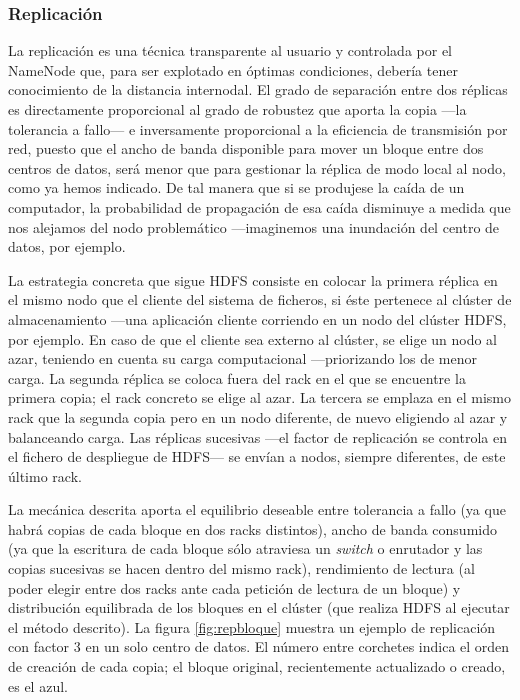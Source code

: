 \subsubsection{Replicaci\'on}\label{subsubsec:replicacionbloques}
\noindent La replicaci\'on es una t\'ecnica transparente al usuario y controlada por el NameNode que, para ser explotado en \'optimas condiciones, deber\'ia tener conocimiento de la distancia internodal. El grado de separaci\'on entre dos r\'eplicas es directamente proporcional al grado de robustez que aporta la copia ---la tolerancia a fallo--- e inversamente proporcional a la eficiencia de transmisi\'on por red, puesto que el ancho de banda disponible para mover un bloque entre dos centros de datos, ser\'a menor que para gestionar la r\'eplica de modo local al nodo, como ya hemos indicado. De tal manera que si se produjese la ca\'ida de un computador, la probabilidad de propagaci\'on de esa ca\'ida disminuye a medida que nos alejamos del nodo problem\'atico ---imaginemos una inundaci\'on del centro de datos, por ejemplo.\newline

La estrategia concreta que sigue HDFS consiste en colocar la primera r\'eplica en el mismo nodo que el cliente del sistema de ficheros, si \'este pertenece al cl\'uster de almacenamiento ---una aplicaci\'on cliente corriendo en un nodo del cl\'uster HDFS, por ejemplo. En caso de que el cliente sea externo al cl\'uster, se elige un nodo al azar, teniendo en cuenta su carga computacional ---prio\-ri\-zan\-do los de menor carga. La segunda r\'eplica se coloca fuera del rack en el que se encuentre la primera copia; el rack concreto se elige al azar. La tercera se emplaza en el mismo rack que la segunda copia pero en un nodo diferente, de nuevo eligiendo al azar y balanceando carga. Las r\'eplicas sucesivas ---el factor de replicaci\'on se controla en el fichero de despliegue de HDFS--- se env\'ian a nodos, siempre diferentes, de este \'ultimo rack.\newline

La mec\'anica descrita aporta el equilibrio deseable entre tolerancia a fallo (ya que habr\'a copias de cada bloque en dos racks distintos), ancho de banda consumido (ya que la escritura de cada bloque s\'olo atraviesa un \emph{switch} o enrutador y las copias sucesivas se hacen dentro del mismo rack), rendimiento de lectura (al poder elegir entre dos racks ante cada petici\'on de lectura de un bloque) y distribuci\'on equilibrada de los bloques en el cl\'uster (que realiza HDFS al ejecutar el m\'etodo descrito). La figura \ref{fig:repbloque} muestra un ejemplo de replicaci\'on con factor 3 en un solo centro de datos. El n\'umero entre corchetes indica el orden de creaci\'on de cada copia; el bloque original, recientemente actualizado o creado, es el azul.

